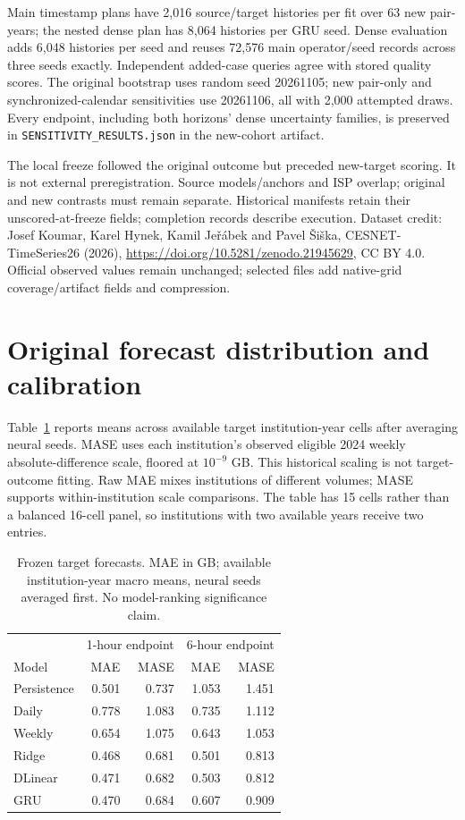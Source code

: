 \documentclass[conference]{IEEEtran}
\begin{document}
Main timestamp plans have 2,016 source/target histories per fit over 63 new pair-years; the nested dense plan has 8,064 histories per GRU seed. Dense evaluation adds 6,048 histories per seed and reuses 72,576 main operator/seed records across three seeds exactly. Independent added-case queries agree with stored quality scores. The original bootstrap uses random seed 20261105; new pair-only and synchronized-calendar sensitivities use 20261106, all with 2,000 attempted draws. Every endpoint, including both horizons' dense uncertainty families, is preserved in \texttt{SENSITIVITY\_RESULTS.json} in the new-cohort artifact.

The local freeze followed the original outcome but preceded new-target scoring. It is not external preregistration. Source models/anchors and ISP overlap; original and new contrasts must remain separate. Historical manifests retain their unscored-at-freeze fields; completion records describe execution. Dataset credit: Josef Koumar, Karel Hynek, Kamil Je\v{r}\'abek and Pavel \v{S}i\v{s}ka, CESNET-TimeSeries26 (2026), \url{https://doi.org/10.5281/zenodo.21945629}, CC BY 4.0. Official observed values remain unchanged; selected files add native-grid coverage/artifact fields and compression.

\section{Original forecast distribution and calibration}
Table~\ref{tab:forecast} reports means across available target institution-year cells after averaging neural seeds. MASE uses each institution's observed eligible 2024 weekly absolute-difference scale, floored at $10^{-9}$ GB. This historical scaling is not target-outcome fitting. Raw MAE mixes institutions of different volumes; MASE supports within-institution scale comparisons. The table has 15 cells rather than a balanced 16-cell panel, so institutions with two available years receive two entries.

\begin{table}[t]\centering\caption{Frozen target forecasts. MAE in GB; available institution-year macro means, neural seeds averaged first. No model-ranking significance claim.}\label{tab:forecast}
\begin{tabular}{lrrrr}\toprule
&\multicolumn{2}{c}{1-hour endpoint}&\multicolumn{2}{c}{6-hour endpoint}\\
Model&MAE&MASE&MAE&MASE\\\midrule
Persistence&0.501&0.737&1.053&1.451\\
Daily&0.778&1.083&0.735&1.112\\
Weekly&0.654&1.075&0.643&1.053\\
Ridge&0.468&0.681&0.501&0.813\\
DLinear&0.471&0.682&0.503&0.812\\
GRU&0.470&0.684&0.607&0.909\\\bottomrule
\end{tabular}\end{table}
\end{document}
